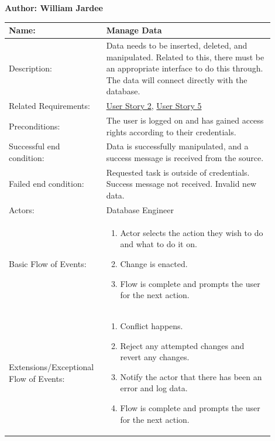 \documentclass[11pt]{article}
\begin{document}
\begin{table}[!ht]
\begin{center}
\textbf{Author: William Jardee}
\vspace*{1em}

\begin{tabular}{p{0.30\linewidth}p{0.60\linewidth}}
	Name: & Manage Data\\\hline
	Description: & Data needs to be inserted, deleted, and manipulated. Related to this, there must be an appropriate interface to do this through. The data will connect directly with the database.\\\hline
	Related Requirements:& \hyperlink{us2}{User Story 2}, \hyperlink{us5}{User Story 5}\\\hline
	Preconditions:& The user is logged on and has gained access rights according to their credentials.\\\hline
	Successful end condition:& Data is successfully manipulated, and a success message is received from the source. \\\hline
	Failed end condition:& Requested task is outside of credentials. Success message not received. Invalid new data.\\\hline
	Actors:& Database Engineer\\\hline
	Basic Flow of Events: & \begin{enumerate}
	\item Actor selects the action they wish to do and what to do it on.
	\item Change is enacted.
	\item Flow is complete and prompts the user for the next action.
	\end{enumerate}\\\hline
	Extensions/Exceptional Flow of Events: & \begin{enumerate}
	\item Conflict happens.
	\item Reject any attempted changes and revert any changes.
	\item Notify the actor that there has been an error and log data.
	\item Flow is complete and prompts the user for the next action.
	\end{enumerate}
\end{tabular}
\label{des:man_dat}	
\end{center}
\end{table}
\end{document}
